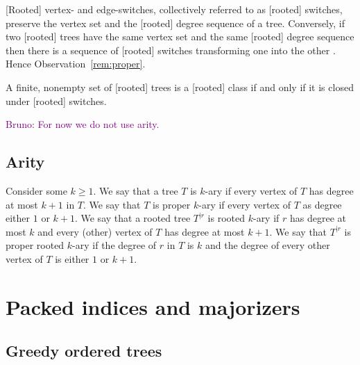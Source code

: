 \documentclass[11 pt]{modarticle}
\newcommand{\rtree}[2]{{#1}^{\lvert #2}}
\newcommand{\tclass}{\mathcal{C}}
\newcommand{\rtclass}{\mathcal{R}}
\newcommand{\bldcomment}[1]{\textcolor{purple}{{\footnotesize Bruno:} #1}}
\begin{document}
[Rooted] vertex- and edge-switches, collectively referred to as [rooted] switches, preserve the vertex set and the [rooted] degree sequence of a tree. Conversely, if two [rooted] trees have the same vertex set and the same [rooted] degree sequence then there is a sequence of [rooted] switches %
transforming one into the other
\cite[Theorem~4.3]{switch}. %
Hence Observation~\ref{rem:proper}.

\begin{rem}\label{rem:proper}
A finite, nonempty set of [rooted] trees is a [rooted] class if and only if it is closed under [rooted] switches.
\end{rem}

\bldcomment{For now we do not use arity.}
\subsection{Arity}

Consider some $k \geq 1$. We say that a tree $T$ is $k$-ary if every vertex of $T$ has degree at most $k+1$ in $T$. We say that $T$ is proper $k$-ary if every vertex of $T$ as degree either $1$ or $k+1$. We say that a rooted tree $\rtree{T}{r}$ is rooted $k$-ary if $r$ has degree at most $k$ and every (other) vertex of $T$ has degree at most $k+1$. We say that $\rtree{T}{r}$ is proper rooted $k$-ary if the degree of $r$ in $T$ is $k$ and the degree of every other vertex of $T$ is either $1$ or $k+1$. 


\section{Packed indices and majorizers}

\subsection{Greedy ordered trees}
\end{document}
